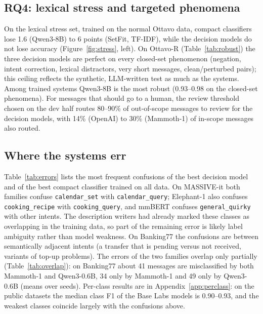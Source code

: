 \subsection{RQ4: lexical stress and targeted phenomena}

On the lexical stress set, trained on the normal Ottavo data, compact classifiers lose 1.6 (Qwen3-8B) to 6 points (SetFit, TF-IDF), while the
decision models do not lose accuracy (Figure~\ref{fig:stress}, left). On Ottavo-R (Table~\ref{tab:robust}) the three decision models are
perfect on every closed-set phenomenon (negation, intent correction, lexical distractors, very short messages, clean/perturbed pairs);
this ceiling reflects the synthetic, LLM-written test as much as the systems. Among trained systems Qwen3-8B is the most robust (0.93--0.98
on the closed-set phenomena). For messages that should go to a human, the review threshold chosen on the dev half routes 80--90\% of
out-of-scope messages to review for the decision models, with 14\% (OpenAI) to 30\% (Mammoth-1) of in-scope messages also routed.

\subsection{Where the systems err}

Table~\ref{tab:errors} lists the most frequent confusions of the best decision model and of the best compact classifier trained
on all data. On MASSIVE-it both families confuse \nolinkurl{calendar_set} with \nolinkurl{calendar_query}; Elephant-1 also confuses
\nolinkurl{cooking_recipe} with \nolinkurl{cooking_query}, and mmBERT confuses \nolinkurl{general_quirky} with other intents. The
description writers had already marked these classes as overlapping in the training data, so part of the remaining error is likely label
ambiguity rather than model weakness. On Banking77
the confusions are between semantically adjacent intents (a transfer that is pending versus not received, variants of top-up
problems). The errors of the two families overlap only partially (Table~\ref{tab:overlap}): on Banking77 about 41 messages are
misclassified by both Mammoth-1 and Qwen3-0.6B, 34 only by Mammoth-1 and 49 only by Qwen3-0.6B (means over seeds). Per-class
results are in Appendix~\ref{app:perclass}: on the public datasets the median class F1 of the Base Labs models is 0.90--0.93, and
the weakest classes coincide largely with the confusions above.

\begin{table}[t]
\centering\footnotesize
\caption{Most frequent confusions (gold $\to$ predicted, number of test messages; compact classifier: mean over three seeds).}
\label{tab:errors}

\end{table}

\begin{table}[t]
\centering\small
\caption{Overlap of errors between the best decision model and the best compact classifier trained on all data (counts of test
messages; compact classifier: mean over the three seeds of the per-seed overlap).}
\label{tab:overlap}
\resizebox{\linewidth}{!}{}
\end{table}
